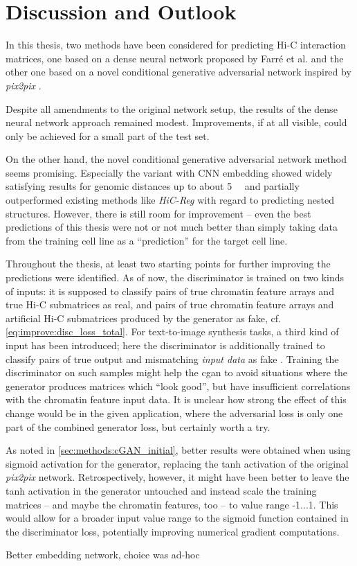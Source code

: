 \section{Discussion and Outlook}
In this thesis, two methods have been considered for predicting Hi-C interaction matrices,
one based on a dense neural network proposed by Farr\'e et al. \cite{Farre2018a} and the other one based on a novel conditional generative adversarial network
inspired by \emph{pix2pix} \cite{Isola2017}.

Despite all amendments to the original network setup,
the results of the dense neural network approach remained modest.
Improvements, if at all visible, could only be achieved for a small part of the test set.

On the other hand, the novel conditional generative adversarial network method seems promising.
Especially the variant with CNN embedding showed widely satisfying results for genomic distances up to about \SI{5}{\mega\bp}
and partially outperformed existing methods like \emph{HiC-Reg} \cite{Zhang2019} with regard to predicting nested structures.
However, there is still room for improvement -- even the best predictions of this thesis were not or not much better 
than simply taking data from the training cell line as a ``prediction'' for the target cell line.

Throughout the thesis, at least two starting points for further improving the predictions were identified.
As of now, the discriminator is trained on two kinds of inputs:
it is supposed to classify pairs of true chromatin feature arrays and true Hi-C submatrices as real, 
and pairs of true chromatin feature arrays and artificial Hi-C submatrices produced by the generator as fake, cf. \cref{eq:improve:disc_loss_total}.
For text-to-image synthesis tasks, a third kind of input has been introduced; here the discriminator is additionally trained 
to classify pairs of true output and mismatching \emph{input data} as fake \cite{Reed2016}.
Training the discriminator on such samples might help the \acrshort{cgan} to avoid situations 
where the generator produces matrices which ``look good'', 
but have insufficient correlations with the chromatin feature input data.
It is unclear how strong the effect of this change would be in the given application, 
where the adversarial loss is only one part of the combined generator loss, but certainly worth a try.

As noted in \cref{sec:methods:cGAN_initial}, better results were obtained when using sigmoid activation for the generator,
replacing the tanh activation of the original \emph{pix2pix} network.
Retrospectively, however, it might have been better to leave the tanh activation in the generator untouched
and instead scale the training matrices -- and maybe the chromatin features, too -- to value range -1...1.
This would allow for a broader input value range to the sigmoid function contained in the discriminator loss,
potentially improving numerical gradient computations.

\xxx \xxx \xxx
Better embedding network, choice was ad-hoc
\xxx \xxx \xxx
